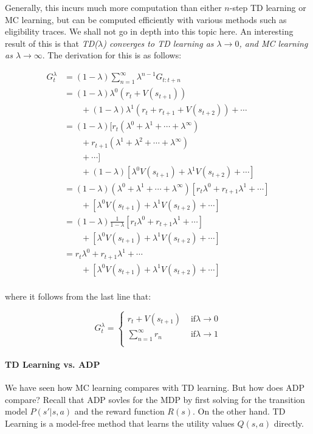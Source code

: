 \documentclass[11pt]{article}
\begin{document}
Generally, this incurs much more computation than either $n$-step TD learning or MC learning, but can be computed efficiently with various methods such as eligibility traces. We shall not go in depth into this topic here. An interesting result of this is that \textit{TD($\lambda$) converges to TD learning as $\lambda \rightarrow 0$, and MC learning as $\lambda \rightarrow \infty$}. The derivation for this is as follows:

$$
\begin{aligned}
G^{\lambda}_t &= (1-\lambda)\sum^{\infty}_{n=1} \lambda^{n-1} G_{t:t+n} \\
&= (1-\lambda)\lambda^0(r_t + V(s_{t+1})) \\
&\qquad + (1-\lambda)\lambda^1(r_t + r_{t+1} + V(s_{t+2})) + \cdots\\
&= (1-\lambda)[ r_t(\lambda^0 + \lambda^1 + \cdots + \lambda^{\infty})\\
&\qquad + r_{t+1}(\lambda^1 + \lambda^2 + \cdots + \lambda^{\infty}) \\
&\qquad + \cdots ]\\
&\qquad + (1-\lambda)[\lambda^0 V(s_{t+1}) + \lambda^1V(s_{t+2}) + \cdots]\\
&= (1-\lambda)(\lambda^0 + \lambda^1 + \cdots + \lambda^{\infty})[r_t\lambda^0 + r_{t+1}\lambda^1 + \cdots]\\
&\qquad + [\lambda^0 V(s_{t+1}) + \lambda^1V(s_{t+2}) + \cdots]\\
&= (1-\lambda)\frac{1}{1-\lambda}[r_t\lambda^0 + r_{t+1}\lambda^1 + \cdots]\\
&\qquad + [\lambda^0 V(s_{t+1}) + \lambda^1V(s_{t+2}) + \cdots]\\
&= r_t\lambda^0 + r_{t+1}\lambda^1 + \cdots\\
&\qquad + [\lambda^0 V(s_{t+1}) + \lambda^1V(s_{t+2}) + \cdots]\\
\end{aligned}
$$

where it follows from the last line that:

$$
G^{\lambda}_t = \begin{cases}
r_t + V(s_{t+1}) & \text{ if} \lambda \rightarrow 0\\
\sum^{\infty}_{n=1} r_n & \text{ if} \lambda \rightarrow 1\\
\end{cases}
$$

\paragraph{TD Learning vs. ADP} We have seen how MC learning compares with TD learning. But how does ADP compare? Recall that ADP sovles for the MDP by first solving for the transition model $P(s' | s, a)$ and the reward function $R(s)$. On the other hand. TD Learning is a model-free method that learns the utility values $Q(s, a)$ directly.\\
\end{document}
